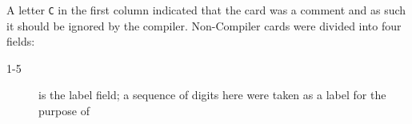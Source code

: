 A letter \verb|C| in the first column indicated that the card was a comment and as such it should be ignored by the compiler. Non-Compiler cards were divided into four fields:
\begin{description}
    \item[1-5] is the label field; a sequence of digits here were taken as a label for the purpose of 
\end{description}

